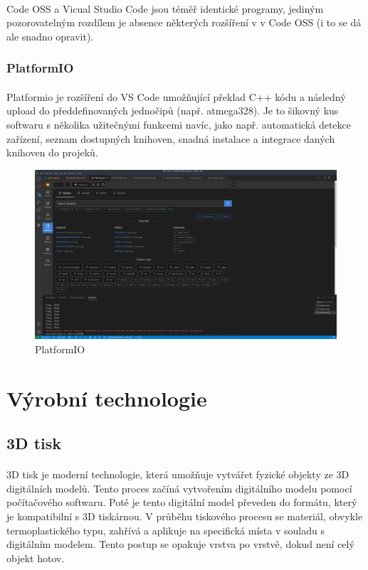 \documentclass[12pt]{article}
\begin{document}
\begin{spacing}{1.5}
	\paragraph{} Code OSS a Vicual Studio Code jsou téměř identické programy, jediným pozorovatelným rozdílem je absence některých rozšíření v  v Code OSS (i to se dá ale snadno opravit).
	
	\subsubsection*{PlatformIO}
	\paragraph{} Platformio je rozšíření do VS Code umožňující překlad C++ kódu a následný upload do předdefinovaných jednočipů (např. atmega328). Je to šikovný kus softwaru s několika užitečnými funkcemi navíc, jako např. automatická detekce zařízení, seznam dostupných knihoven, snadná instalace a integrace daných knihoven do projeků.
	
	\begin{figure}[H]
		\centering
		\includegraphics[width=\linewidth]{images/platformio.png}
		\caption{PlatformIO}
		\label{fig:platformio}
	\end{figure}
	
	\newpage
	\section{Výrobní technologie}
	\subsection{3D tisk}
	\paragraph{} 3D tisk je moderní technologie, která umožňuje vytvářet fyzické objekty ze 3D digitálních modelů. Tento proces začíná vytvořením digitálního modelu pomocí počítačového softwaru. Poté je tento digitální model převeden do formátu, který je kompatibilní s 3D tiskárnou. V průběhu tiskového procesu se materiál, obvykle termoplastického typu, zahřívá a aplikuje na specifická místa v souladu s digitálním modelem. Tento postup se opakuje vrstva po vrstvě, dokud není celý objekt hotov.
	

\end{spacing}
\end{document}
